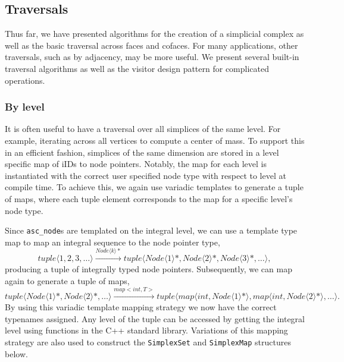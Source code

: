 	\subsection{Traversals}

	\par Thus far, we have presented algorithms for the creation of a simplicial complex as well as the basic traversal across faces and cofaces.
	For many applications, other traversals, such as by adjacency, may be more useful.
	We present several built-in traversal algorithms as well as the visitor design pattern for complicated operations.

	\subsubsection{By level}
		\par It is often useful to have a traversal over all simplices of the same level. For example, iterating across all vertices to compute a center of mass. To support this in an efficient fashion, simplices of the same dimension are stored in a level specific map of iIDs to node pointers. Notably, the map for each level is instantiated with the correct user specified node type with respect to level at compile time. To achieve this, we again use variadic templates to generate a tuple of maps, where each tuple element corresponds to the map for a specific level's node type.

		\par Since \verb|asc_node|s are templated on the integral level, we can use a template type map to map an integral sequence to the node pointer type,
		\begin{equation*}
			tuple\langle 1,2,3,\ldots\rangle \xrightarrow{Node\langle k\rangle *} tuple\langle Node\langle 1\rangle *, Node\langle 2\rangle *, Node\langle 3\rangle *, \ldots\rangle,
		\end{equation*}
		producing a tuple of integrally typed node pointers. Subsequently, we can map again to generate a tuple of maps,
		\begin{equation*}
			tuple\langle Node\langle 1\rangle *, Node\langle 2\rangle *,\ldots\rangle \xrightarrow{map<int,T>}
			tuple\langle map\langle int, Node\langle 1\rangle *\rangle, map\langle int, Node\langle 2\rangle *\rangle,\ldots\rangle.
		\end{equation*}
		By using this variadic template mapping strategy we now have the correct typenames assigned. Any level of the tuple can be accessed by getting the integral level using functions in the C++ standard library. Variations of this mapping strategy are also used to construct the \verb|SimplexSet| and \verb|SimplexMap| structures below.

